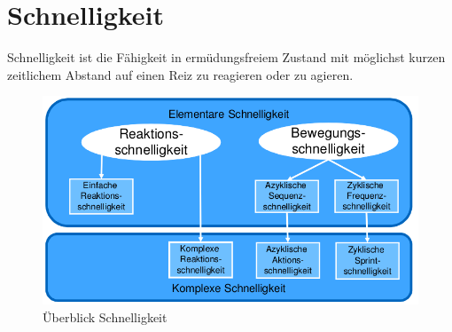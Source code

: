
\section{Schnelligkeit}
Schnelligkeit ist die Fähigkeit in ermüdungsfreiem Zustand mit möglichst kurzen zeitlichem Abstand auf einen Reiz zu reagieren oder zu agieren.
\begin{figure}
  \centering
  \includegraphics[width=.5\textwidth]{pictures/schnelligkeit_overview.png}
  \caption{Überblick Schnelligkeit}
\end{figure}
